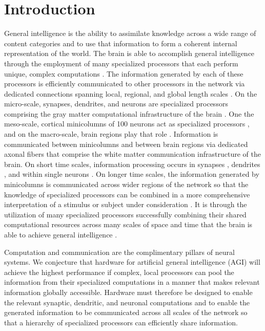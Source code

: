 \documentclass[twocolumn]{article}
\begin{document}
\section{\label{sec:introduction}Introduction}
General intelligence is the ability to assimilate knowledge across a wide range of content categories and to use that information to form a coherent internal representation of the world. The brain is able to accomplish general intelligence through the employment of many specialized processors that each perform unique, complex computations \cite{ba1988,de2014}. The information generated by each of these processors is efficiently communicated to other processors in the network via dedicated connections spanning local, regional, and global length scales \cite{sp2010}. On the micro-scale, synapses, dendrites, and neurons are specialized processors comprising the gray matter computational infrastructure of the brain \cite{geki2002}. One the meso-scale, cortical minicolumns of 100 neurons act as specialized processors \cite{mo1997}, and on the macro-scale, brain regions play that role \cite{brme2010}. Information is communicated between minicolumns and between brain regions via dedicated axonal fibers that comprise the white matter communication infrastructure of the brain. On short time scales, information processing occurs in synapses \cite{abre2004}, dendrites \cite{stsp2015}, and within single neurons \cite{ko1997}. On longer time scales, the information generated by minicolumns is communicated across wider regions of the network so that the knowledge of specialized processors can be combined in a more comprehensive interpretation of a stimulus or subject under consideration \cite{bu2006}. It is through the utilization of many specialized processors successfully combining their shared computational resources across many scales of space and time that the brain is able to achieve general intelligence \cite{ba1988,de2014}. 

Computation and communication are the complimentary pillars of neural systems. We conjecture that hardware for artificial general intelligence (AGI) will achieve the highest performance if complex, local processors can pool the information from their specialized computations in a manner that makes relevant information globally accessible. Hardware must therefore be designed to enable the relevant synaptic, dendritic, and neuronal computations and to enable the generated information to be communicated across all scales of the network so that a hierarchy of specialized processors can efficiently share information. 
\end{document}
